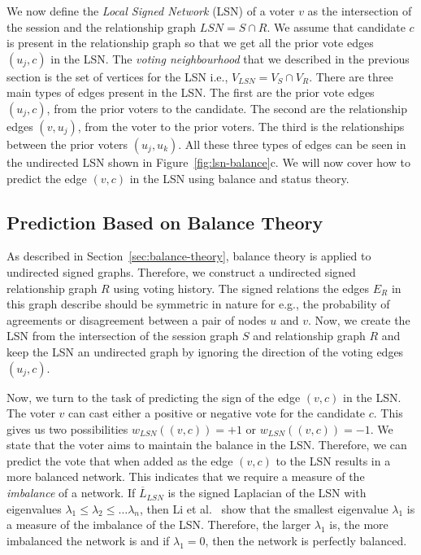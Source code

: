 We now define the \textit{Local Signed Network} (LSN) of a voter $v$ as the intersection of the session and the relationship graph $LSN=S \cap R$. We assume that candidate $c$ is present in the relationship graph so that we get all the prior vote edges $(u_j,c)$ in the LSN. The \textit{voting neighbourhood} that we described in the previous section is the set of vertices for the LSN i.e., $V_{LSN}=V_S \cap V_R$. There are three main types of edges present in the LSN. The first are the prior vote edges $(u_j,c)$, from the prior voters to the candidate. The second are the relationship edges $(v,u_j)$, from the voter to the prior voters. The third is the relationships between the prior voters $(u_j,u_k)$. All these three types of edges can be seen in the undirected LSN shown in Figure~\ref{fig:lsn-balance}c. We will now cover how to predict the edge $(v,c)$ in the LSN using balance and status theory.  

\subsection{Prediction Based on Balance Theory}
\label{subsec:prediction-based-balance}
As described in Section~\ref{sec:balance-theory}, balance theory is applied to undirected signed graphs. Therefore, we construct a undirected signed relationship graph $R$ using voting history. The signed relations the edges $E_R$ in this graph describe should be symmetric in nature for e.g., the probability of agreements or disagreement between a pair of nodes $u$ and $v$. Now, we create the LSN from the intersection of the session graph $S$ and relationship graph $R$ and keep the LSN an undirected graph by ignoring the direction of the voting edges $(u_j,c)$. 

Now, we turn to the task of predicting the sign of the edge $(v,c)$ in the LSN. The voter $v$ can cast either a positive or negative vote for the candidate $c$. This gives us two possibilities $w_{LSN}((v,c))=+1$ or $w_{LSN}((v,c))=-1$. We state that the voter aims to maintain the balance in the LSN. Therefore, we can predict the vote that when added as the edge $(v,c)$ to the LSN results in a more balanced network. This indicates that we require a measure of the \textit{imbalance} of a network. If $\overline{L}_{LSN}$ is the signed Laplacian of the LSN with eigenvalues $\lambda_1\leq\lambda_2\leq\dots\lambda_n$, then Li et al.\ \cite{li2016note} show that the smallest eigenvalue $\lambda_1$ is a measure of the imbalance of the LSN. Therefore, the larger $\lambda_1$ is, the more imbalanced the network is and if $\lambda_1=0$, then the network is perfectly balanced. 
 
